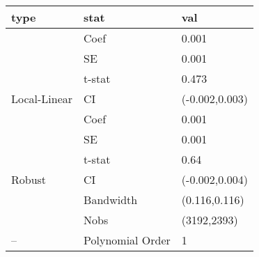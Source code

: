 
\begin{tabular}{lll}
\toprule
type & stat & val\\
\midrule
 & Coef & 0.001\\

 & SE & 0.001\\

 & t-stat & 0.473\\

\multirow{-4}{*}{\raggedright\arraybackslash Local-Linear} & CI & (-0.002,0.003)\\
\cmidrule{1-3}
 & Coef & 0.001\\

 & SE & 0.001\\

 & t-stat & 0.64\\

\multirow{-4}{*}{\raggedright\arraybackslash Robust} & CI & (-0.002,0.004)\\
\cmidrule{1-3}
 & Bandwidth & (0.116,0.116)\\

 & Nobs & (3192,2393)\\

\multirow{-3}{*}{\raggedright\arraybackslash --} & Polynomial Order & 1\\
\bottomrule
\end{tabular}